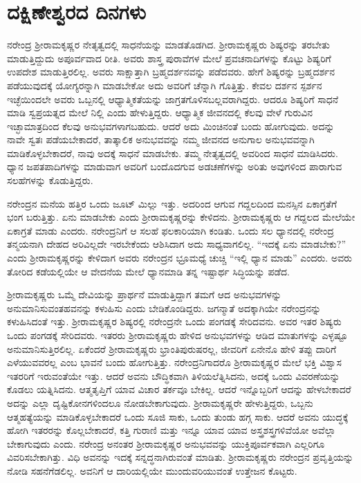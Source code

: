 
\chapter{ದಕ್ಷಿಣೇಶ್ವರದ ದಿನಗಳು}

ನರೇಂದ್ರ ಶ‍್ರೀರಾಮಕೃಷ್ಣರ ನೇತೃತ್ವದಲ್ಲಿ ಸಾಧನೆಯನ್ನು ಮಾಡತೊಡಗಿದ. ಶ‍್ರೀರಾಮಕೃಷ್ಣರು ಶಿಷ್ಯರನ್ನು ತರಬೇತು ಮಾಡುತ್ತಿದ್ದುದು ಅಪೂರ್ವವಾದ ರೀತಿ. ಅವರು ಶಾಸ್ತ್ರ ಪುರಾವೆಗಳ ಮೇಲೆ ಪ್ರವಚನಾದಿಗಳನ್ನು ಕೊಟ್ಟು ಶಿಷ್ಯರಿಗೆ ಉಪದೇಶ ಮಾಡುತ್ತಿರಲಿಲ್ಲ. ಅವರು ಸಾಕ್ಷಾತ್ತಾಗಿ ಬ್ರಹ್ಮದರ್ಶನವನ್ನು ಪಡೆದವರು. ಹೇಗೆ ಶಿಷ್ಯರನ್ನು ಬ್ರಹ್ಮದರ್ಶನ ಪಡೆಯುವುದಕ್ಕೆ ಯೋಗ್ಯರನ್ನಾಗಿ ಮಾಡಬೇಕೋ ಅದು ಅವರಿಗೆ ಚೆನ್ನಾಗಿ ಗೊತ್ತಿತ್ತು. ಕೇವಲ ದರ್ಶನ ಸ್ಪರ್ಶನ ಇಚ್ಛೆಯಿಂದಲೇ ಅವರು ಒಬ್ಬನಲ್ಲಿ ಆಧ್ಯಾತ್ಮಿಕತೆಯನ್ನು ಜಾಗ್ರತಗೊಳಿಸಬಲ್ಲವರಾಗಿದ್ದರು. ಆದರೂ ಶಿಷ್ಯರಿಗೆ ಸಾಧನೆ ಮಾಡಿ ಸ್ವಪ್ರಯತ್ನದ ಮೇಲೆ ನಿಲ್ಲಿ ಎಂದು ಹೇಳುತ್ತಿದ್ದರು. ಆಧ್ಯಾತ್ಮಿಕ ಜೀವನದಲ್ಲಿ ಕೆಲವು ವೇಳೆ ಗುರುವಿನ ಇಚ್ಛಾಮಾತ್ರದಿಂದ ಕೆಲವು ಅನುಭವಗಳಾಗಬಹುದು. ಆದರೆ ಅದು ಮಿಂಚಿನಂತೆ ಬಂದು ಹೋಗುವುದು. ಅದನ್ನು ನಾವೇ ಸ್ವತಃ ಪಡೆಯಬೇಕಾದರೆ, ತಾತ್ಕಾಲಿಕ ಅನುಭವವನ್ನು ನಮ್ಮ ಜೀವನದ ಅನುಗಾಲ ಅನುಭವವನ್ನಾಗಿ ಮಾಡಿಕೊಳ್ಳಬೇಕಾದರೆ, ನಾವು ಅದಕ್ಕೆ ಸಾಧನೆ ಮಾಡಬೇಕು. ತಮ್ಮ ನೇತೃತ್ವದಲ್ಲಿ ಅವರಿಂದ ಸಾಧನೆ ಮಾಡಿಸಿದರು. ಧ್ಯಾನ ಜಪತಪಾದಿಗಳನ್ನು ಮಾಡುವಾಗ ಅವರಿಗೆ ಬಂದೊದಗುವ ಅಡಚಣೆಗಳನ್ನು ಅರಿತು ಅವುಗಳಿಂದ ಪಾರಾಗುವ ಸಲಹೆಗಳನ್ನು ಕೊಡುತ್ತಿದ್ದರು.

ನರೇಂದ್ರನ ಮನೆಯ ಹತ್ತಿರ ಒಂದು ಜೂಟ್ ಮಿಲ್ಲು ಇತ್ತು. ಅದರಿಂದ ಆಗುವ ಗದ್ದಲದಿಂದ ಮನಸ್ಸಿನ ಏಕಾಗ್ರತೆಗೆ ಭಂಗ ಬರುತ್ತಿತ್ತು. ಏನು ಮಾಡಬೇಕು ಎಂದು ಶ‍್ರೀರಾಮಕೃಷ್ಣರನ್ನು ಕೇಳಿದನು. ಶ‍್ರೀರಾಮಕೃಷ್ಣರು ಆ ಗದ್ದಲದ ಮೇಲೆಯೇ ಏಕಾಗ್ರತೆ ಮಾಡು ಎಂದರು. ನರೇಂದ್ರನಿಗೆ ಆ ಸಲಹೆ ಫಲಕಾರಿಯಾಗಿ ಕಂಡಿತು. ಒಂದು ಸಲ ಧ್ಯಾನದಲ್ಲಿ ನರೇಂದ್ರ ತನ್ಮಯನಾಗಿ ದೇಹದ ಅರಿವಿಲ್ಲದೇ ಇರಬೇಕೆಂದು ಆಶಿಸಿದಾಗ ಅದು ಸಾಧ್ಯವಾಗಲಿಲ್ಲ. “ಇದಕ್ಕೆ ಏನು ಮಾಡಬೇಕು?” ಎಂದು ಶ‍್ರೀರಾಮಕೃಷ್ಣರನ್ನು ಕೇಳಿದಾಗ ಅವರು ನರೇಂದ್ರನ ಭ್ರೂಮಧ್ಯೆ ಚುಚ್ಚಿ “ಇಲ್ಲಿ ಧ್ಯಾನ ಮಾಡು” ಎಂದರು. ಅವರು ತೋರಿದ ಕಡೆಯಲ್ಲಿಯೇ ಆ ವೇದನೆಯ ಮೇಲೆ ಧ್ಯಾನಮಾಡಿ ತನ್ನ ಇಷ್ಟಾರ್ಥ ಸಿದ್ಧಿಯನ್ನು ಪಡೆದ.

ಶ‍್ರೀರಾಮಕೃಷ್ಣರು ಒಮ್ಮೆ ದೇವಿಯನ್ನು ಪ್ರಾರ್ಥನೆ ಮಾಡುತ್ತಿದ್ದಾಗ ತಮಗೆ ಆದ ಅನುಭವಗಳನ್ನು ಅನುಮಾನಿಸುವಂತಹವನನ್ನು ಕಳುಹಿಸು ಎಂದು ಬೇಡಿಕೊಂಡಿದ್ದರು. ಜಗನ್ಮಾತೆ ಅದಕ್ಕಾಗಿಯೇ ನರೇಂದ್ರನನ್ನು ಕಳುಹಿಸಿದಂತೆ ಇತ್ತು. ಶ‍್ರೀರಾಮಕೃಷ್ಣರ ಶಿಷ್ಯರಲ್ಲಿ ನರೇಂದ್ರನೇ ಒಂದು ಪಂಗಡಕ್ಕೆ ಸೇರಿದವನು. ಅವರ ಇತರ ಶಿಷ್ಯರು ಒಂದು ಪಂಗಡಕ್ಕೆ ಸೇರಿದವರು. ಇತರರು ಶ‍್ರೀರಾಮಕೃಷ್ಣರು ಹೇಳಿದ ಅನುಭವಗಳನ್ನು ಆಡಿದ ಮಾತುಗಳನ್ನು ಎಳ್ಳಷ್ಟೂ ಅನುಮಾನಿಸುತ್ತಿರಲಿಲ್ಲ. ಏಕೆಂದರೆ ಶ‍್ರೀರಾಮಕೃಷ್ಣರು ಭ್ರಾಂತಿಪುರುಷರಲ್ಲ, ಜೀವರಿಗೆ ಏನೇನೊ ಹೇಳಿ ತಪ್ಪು ದಾರಿಗೆ ಎಳೆಯುವವರಲ್ಲ ಎಂಬ ಭಾವನೆ ಬಂದು ಹೋಗುತ್ತಿತ್ತು. ನರೇಂದ್ರನಿಗಾದರೊ ಶ‍್ರೀರಾಮಕೃಷ್ಣರ ಮೇಲೆ ಭಕ್ತಿ ವಿಶ್ವಾಸ ಇತರರಿಗೆ ಇರುವಂತೆಯೇ ಇತ್ತು. ಆದರೆ ಅವನು ಬೌದ್ಧಿಕವಾಗಿ ತಿಳಿಯಲೆತ್ನಿಸಿದನು, ಅದಕ್ಕೆ ಒಂದು ವಿವರಣೆಯನ್ನು ಕೊಡಲು ಯತ್ನಿಸಿದನು. ಆತ್ಮತೃಪ್ತಿಗೆ ಯಾವ ವಿಚಾರ ತರ್ಕವೂ ಬೇಕಿಲ್ಲ. ಆದರೆ ಇನ್ನೊಬ್ಬರಿಗೆ ಆದನ್ನು ಹೇಳಬೇಕಾದರೆ ಅದನ್ನು ಎಲ್ಲಾ ದೃಷ್ಟಿಕೋನಗಳಿಂದಲೂ ನೋಡಬೇಕಾಗುವುದು. ಶ‍್ರೀರಾಮಕೃಷ್ಣರೇ ಹೇಳುತ್ತಿದ್ದರು, ಒಬ್ಬನು ಆತ್ಮಹತ್ಯೆಯನ್ನು ಮಾಡಿಕೊಳ್ಳಬೇಕಾದರೆ ಒಂದು ಸೂಜಿ ಸಾಕು, ಒಂದು ತುಂಡು ಹಗ್ಗ ಸಾಕು. ಆದರೆ ಅವನು ಯುದ್ಧಕ್ಕೆ ಹೋಗಿ ಇತರರನ್ನು ಕೊಲ್ಲಬೇಕಾದರೆ, ಕತ್ತಿ ಗುರಾಣಿ ಮತ್ತು ಇನ್ನೂ ಯಾವ ಯಾವ ಅಸ್ತ್ರಶಸ್ತ್ರಗಳಿವೆಯೋ ಅವೆಲ್ಲಾ ಬೇಕಾಗುವುದು ಎಂದು. ನರೇಂದ್ರ ಅನಂತರ ಶ‍್ರೀರಾಮಕೃಷ್ಣರ ಅನುಭವವನ್ನು ಯುಕ್ತಿಪೂರ್ವಕವಾಗಿ ಎಲ್ಲರಿಗೂ ವಿವರಿಸಬೇಕಾಗಿತ್ತು. ವಿಧಿ ಅವನನ್ನು ಇದಕ್ಕೆ ಸನ್ನದ್ಧನಾಗಿರುವಂತೆ ಮಾಡಿತು. ಶ‍್ರೀರಾಮಕೃಷ್ಣರು ನರೇಂದ್ರನ ಪ್ರವೃತ್ತಿಯನ್ನು ನೋಡಿ ಸಹನೆಗೆಡಲಿಲ್ಲ. ಅವನಿಗೆ ಆ ದಾರಿಯಲ್ಲಿಯೇ ಮುಂದುವರಿಯುವಂತೆ ಉತ್ತೇಜನ ಕೊಟ್ಟರು.

